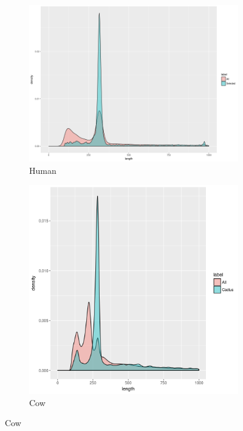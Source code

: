 \documentclass{article}
\begin{document}
\begin{figure}[h]
  \begin{subfigure}[b]{0.5\textwidth}
    \includegraphics[width=\textwidth]{figures/human_clustered_dist}
    \caption{Human}
  \end{subfigure}
  \begin{subfigure}[b]{0.5\textwidth}
    \includegraphics[width=\textwidth]{figures/cow_clustered_dist}
    \caption{Cow}
  \end{subfigure}

\end{figure}
\end{document}
